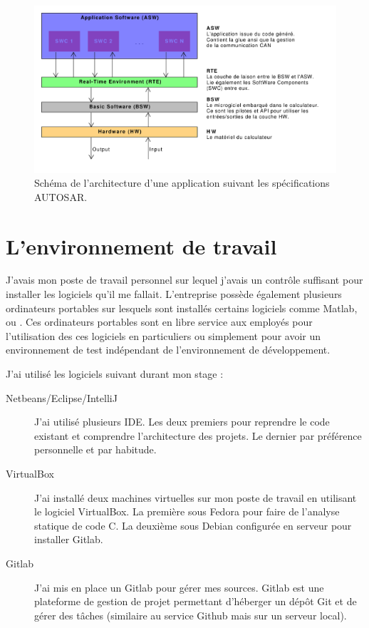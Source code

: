 \begin{figure}[h]
  \centering
  \includegraphics[scale=0.45]{images/autosar_arch.pdf}
  \caption{Schéma de l'architecture d'une application suivant les spécifications AUTOSAR.}
  \label{fig:autosar}
\end{figure}


\section{L'environnement de travail}
J'avais mon poste de travail personnel sur lequel j'avais un contrôle suffisant pour installer les logiciels qu'il me fallait.
L'entreprise possède également plusieurs ordinateurs portables sur lesquels sont installés certains logiciels comme Matlab\up{\circledR},  ou . Ces ordinateurs portables sont en libre service aux employés pour l'utilisation des ces logiciels en particuliers ou simplement pour avoir un environnement de test indépendant de l'environnement de développement.

J'ai utilisé les logiciels suivant durant mon stage :
\begin{description}
  \item[Netbeans/Eclipse/IntelliJ] J'ai utilisé plusieurs IDE. Les deux premiers pour reprendre le code existant et comprendre l'architecture des projets. Le dernier par préférence personnelle et par habitude.
  \item[VirtualBox] J'ai installé deux machines virtuelles sur mon poste de travail en utilisant le logiciel VirtualBox. La première sous Fedora pour faire de l'analyse statique de code C. La deuxième sous Debian configurée en serveur pour installer Gitlab.
  \item[Gitlab] J'ai mis en place un Gitlab pour gérer mes sources. Gitlab est une plateforme de gestion de projet permettant d'héberger un dépôt Git et de gérer des tâches (similaire au service Github mais sur un serveur local).
\end{description}

